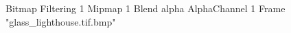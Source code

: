 {Bitmap
	{Filtering 1}
	{Mipmap 1}
	{Blend alpha}
	{AlphaChannel 1}
	{Frame "glass_lighthouse.tif.bmp"}
}
